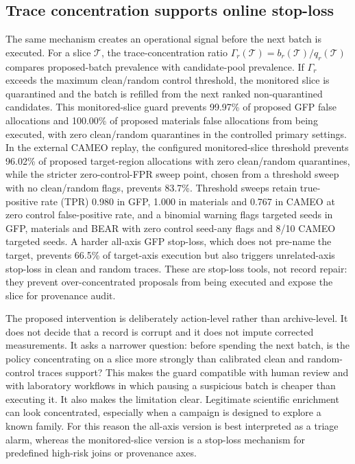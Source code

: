 \subsection*{Trace concentration supports online stop-loss}
The same mechanism creates an operational signal before the next batch is executed. For a slice \(\mathcal{T}\), the trace-concentration ratio \(\Gamma_r(\mathcal{T})=b_r(\mathcal{T})/q_r(\mathcal{T})\) compares proposed-batch prevalence with candidate-pool prevalence. If \(\Gamma_r\) exceeds the maximum clean/random control threshold, the monitored slice is quarantined and the batch is refilled from the next ranked non-quarantined candidates. This monitored-slice guard prevents 99.97\% of proposed GFP false allocations and 100.00\% of proposed materials false allocations from being executed, with zero clean/random quarantines in the controlled primary settings. In the external CAMEO replay, the configured monitored-slice threshold prevents 96.02\% of proposed target-region allocations with zero clean/random quarantines, while the stricter zero-control-FPR sweep point, chosen from a threshold sweep with no clean/random flags, prevents 83.7\%. Threshold sweeps retain true-positive rate (TPR) 0.980 in GFP, 1.000 in materials and 0.767 in CAMEO at zero control false-positive rate, and a binomial warning flags targeted seeds in GFP, materials and BEAR with zero control seed-any flags and 8/10 CAMEO targeted seeds. A harder all-axis GFP stop-loss, which does not pre-name the target, prevents 66.5\% of target-axis execution but also triggers unrelated-axis stop-loss in clean and random traces. These are stop-loss tools, not record repair: they prevent over-concentrated proposals from being executed and expose the slice for provenance audit.

The proposed intervention is deliberately action-level rather than archive-level. It does not decide that a record is corrupt and it does not impute corrected measurements. It asks a narrower question: before spending the next batch, is the policy concentrating on a slice more strongly than calibrated clean and random-control traces support? This makes the guard compatible with human review and with laboratory workflows in which pausing a suspicious batch is cheaper than executing it. It also makes the limitation clear. Legitimate scientific enrichment can look concentrated, especially when a campaign is designed to explore a known family. For this reason the all-axis version is best interpreted as a triage alarm, whereas the monitored-slice version is a stop-loss mechanism for predefined high-risk joins or provenance axes.

